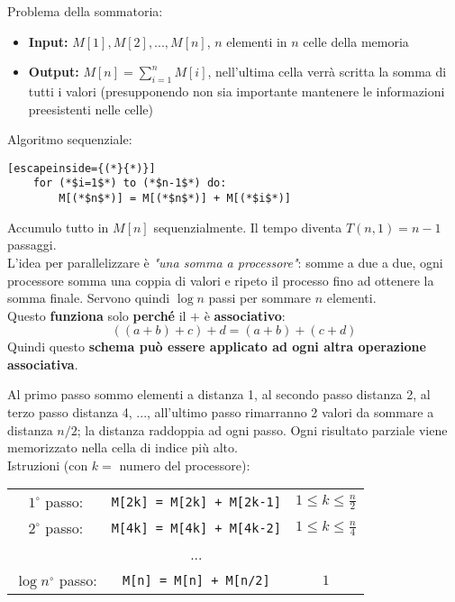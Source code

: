 Problema della sommatoria: 
\begin{itemize}
	\item \textbf{Input:} $M[1], M[2], ... , M[n]$, $n$ elementi in $n$ celle della memoria
	\item \textbf{Output:} $M[n] = \sum_{i=1}^n M[i]$, nell'ultima cella verrà scritta la somma di tutti i valori (presupponendo non sia importante mantenere le informazioni preesistenti nelle celle)
\end{itemize}

Algoritmo sequenziale: 
\begin{lstlisting}[escapeinside={(*}{*)}]
	for (*$i=1$*) to (*$n-1$*) do:
		M[(*$n$*)] = M[(*$n$*)] + M[(*$i$*)]
\end{lstlisting}
Accumulo tutto in $M[n]$ sequenzialmente. Il tempo diventa $T(n,1) = n-1$ passaggi.\\

L'idea per parallelizzare è \textit{"una somma a processore"}: somme a due a due, ogni processore somma una coppia di valori e ripeto il processo fino ad ottenere la somma finale. Servono quindi $\log n$ passi per sommare $n$ elementi.\\

Questo \textbf{funziona }solo \textbf{perché} il $+$ è \textbf{associativo}:
$$ ((a+b) + c) + d = (a+b) + (c+d)$$
Quindi questo \textbf{schema può essere applicato ad ogni altra operazione associativa}.\\

\newpage

Al primo passo sommo elementi a distanza 1, al secondo passo distanza 2, al terzo passo distanza 4, ..., all'ultimo passo rimarranno 2 valori da sommare a distanza $n/2$; la distanza raddoppia ad ogni passo. Ogni risultato parziale viene memorizzato nella cella di indice più alto.\\

Istruzioni (con $k=$ numero del processore): 
\begin{center}
	\begin{tabular}{c c c}
		$1^{\circ}$ passo: & \texttt{M[2k] = M[2k] + M[2k-1]} & $1 \leq k \leq \frac{n}{2}$ \\
		$2^{\circ}$ passo: & \texttt{M[4k] = M[4k] + M[4k-2]} & $1 \leq k \leq \frac{n}{4}$ \\
		& ... & \\
		$\log n^{\circ}$ passo: & \texttt{M[n] = M[n] + M[n/2]} & $1$
	\end{tabular}
\end{center}

